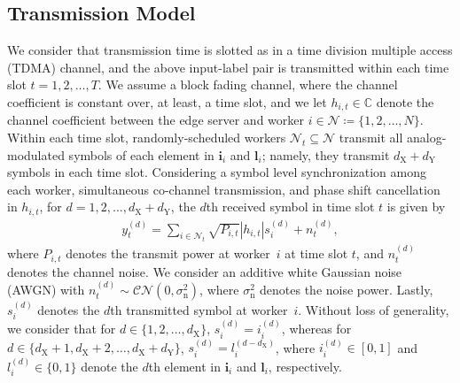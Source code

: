 \documentclass[conference,10pt]{IEEEtran}
\theoremstyle{definition}
\theoremstyle{definition}
\begin{document}
\subsection{Transmission Model}
We consider that transmission time is slotted as in a time division multiple access (TDMA) channel, and the above input-label pair is transmitted within each time slot $t = 1, 2, \dots, T$.
We assume a block fading channel, where the channel coefficient is constant over, at least, a time slot, and we let $h_{i, t}\in\mathbb{C}$ denote the channel coefficient between the edge server and worker $i\in\mathcal{N}\coloneqq \{1, 2, \dots, N\}$.
Within each time slot, randomly-scheduled workers $\mathcal{N}_t\subseteq \mathcal{N}$ transmit all analog-modulated symbols of each element in $\bm{i}_i$ and $\bm{l}_i$; namely, they transmit $d_{\mathrm{X}} + d_{\mathrm{Y}}$ symbols in each time slot.
Considering a symbol level synchronization among each worker, simultaneous co-channel transmission, and phase shift cancellation in $h_{i, t}$, for $d = 1, 2, \dots, d_{\mathrm{X}} + d_{\mathrm{Y}}$, the $d$th received symbol in time slot $t$ is given by
\begin{align}
	\textstyle
	y^{(d)}_{t} = \sum_{i\in\mathcal{N}_t}\sqrt{P_{i, t}}|h_{i, t}| s_{i}^{(d)} + n_{t}^{(d)},
\end{align}
where $P_{i, t}$ denotes the transmit power at worker~$i$ at time slot $t$, and $n^{(d)}_{t}$ denotes the channel noise.
We consider an additive white Gaussian noise (AWGN) with $n^{(d)}_{t}\sim\mathcal{CN}(0, \sigma^2_{\mathrm{n}})$, where $\sigma^2_{\mathrm{n}}$ denotes the noise power.
Lastly, $s^{(d)}_i$ denotes the $d$th transmitted symbol at worker~$i$.
Without loss of generality, we consider that for $d\in\{1, 2, \dots, d_{\mathrm{X}}\}$, $s^{(d)}_i = i^{(d)}_{i}$, whereas for $d\in\{d_{\mathrm{X}} + 1, d_{\mathrm{X}} + 2, \dots, d_{\mathrm{X}} + d_{\mathrm{Y}}\}$, $s^{(d)}_i = l_{i}^{(d - d_{\mathrm{X}})}$, where $i^{(d)}_{i}\in[0, 1]$ and $l^{(d)}_{i}\in \{0, 1\}$ denote the $d$th element in $\bm{i}_i$ and $\bm{l}_i$, respectively.
\end{document}
